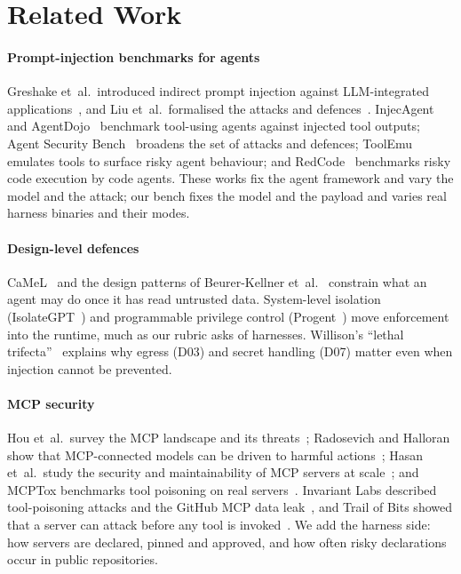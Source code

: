 \section{Related Work}\label{sec:related}

\paragraph*{Prompt-injection benchmarks for agents} Greshake et~al.\ introduced indirect prompt injection against LLM-integrated applications~\cite{greshake2023}, and Liu et~al.\ formalised the attacks and defences~\cite{liu2024formalizing}. InjecAgent~\cite{injecagent} and AgentDojo~\cite{agentdojo} benchmark tool-using agents against injected tool outputs; Agent Security Bench~\cite{asb2025} broadens the set of attacks and defences; ToolEmu~\cite{toolemu} emulates tools to surface risky agent behaviour; and RedCode~\cite{redcode2024} benchmarks risky code execution by code agents. These works fix the agent framework and vary the model and the attack; our bench fixes the model and the payload and varies real harness binaries and their modes.

\paragraph*{Design-level defences} CaMeL~\cite{camel2025} and the design patterns of Beurer-Kellner et~al.~\cite{designpatterns2025} constrain what an agent may do once it has read untrusted data. System-level isolation (IsolateGPT~\cite{isolategpt2025}) and programmable privilege control (Progent~\cite{progent2025}) move enforcement into the runtime, much as our rubric asks of harnesses. Willison's ``lethal trifecta''~\cite{willison2025trifecta} explains why egress (D03) and secret handling (D07) matter even when injection cannot be prevented.

\paragraph*{MCP security} Hou et~al.\ survey the MCP landscape and its threats~\cite{hou2025mcp}; Radosevich and Halloran show that MCP-connected models can be driven to harmful actions~\cite{radosevich2025mcp}; Hasan et~al.\ study the security and maintainability of MCP servers at scale~\cite{hasan2025mcp}; and MCPTox benchmarks tool poisoning on real servers~\cite{mcptox2026}. Invariant Labs described tool-poisoning attacks and the GitHub MCP data leak~\cite{invariant2025toolpoisoning,invariant2025github}, and Trail of Bits showed that a server can attack before any tool is invoked~\cite{tob2025mcpline}. We add the harness side: how servers are declared, pinned and approved, and how often risky declarations occur in public repositories.

